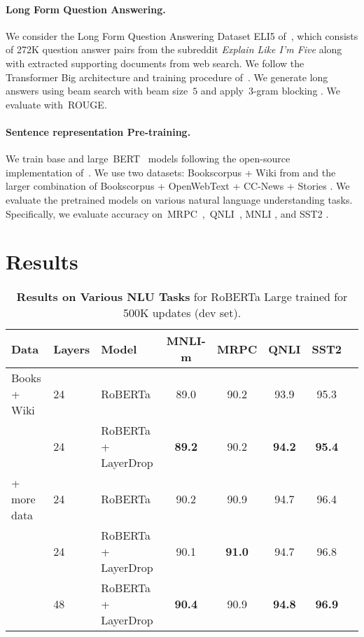 \paragraph{Long Form Question Answering.}

We consider the Long Form Question Answering Dataset ELI5 of~\citet{fan2019eli5}, which consists of 272K question answer pairs from the subreddit \textit{Explain Like I'm Five} along with extracted supporting documents from web search.
We follow the Transformer Big architecture and training procedure of~\citet{fan2019eli5}. We generate long answers using beam search with beam size~$5$ and apply~$3$-gram blocking \citep{fan17controllable}.
We evaluate with~ROUGE.

\paragraph{Sentence representation Pre-training.}

We train base and large~BERT~\citep{devlin2018bert} models following the open-source implementation of~\citet{liu2019roberta}. We use two datasets: Bookscorpus + Wiki from \cite{liu2019roberta} and the larger combination of Bookscorpus + OpenWebText + CC-News + Stories \citep{liu2019roberta}. We evaluate the pretrained models on various natural language understanding tasks.
Specifically, we evaluate accuracy on~MRPC~\citep{dolan2005automatically},~QNLI~\citep{rajpurkar2016squad}, MNLI \citep{williams2018broad}, and SST2 \citep{socher2013recursive}.

\section{Results}


\begin{table}
\centering
\begin{tabular}{lllccccc}
\toprule
Data & Layers & Model  &  MNLI-m & MRPC & QNLI & SST2 \\
\midrule
Books + Wiki & 24 & RoBERTa             &  89.0    & 90.2 & 93.9     & 95.3 \\
 & 24 & RoBERTa + LayerDrop & \bf 89.2 & 90.2 & \bf 94.2 & \bf 95.4 \\
\midrule
+ more data & 24 & RoBERTa             & 90.2 & 90.9 & 94.7 & 96.4 \\
 & 24 & RoBERTa + LayerDrop &  90.1 & \bf 91.0 & 94.7 &  96.8 \\
 & 48\footnotemark & RoBERTa + LayerDrop & \bf 90.4 & 90.9 &  \bf 94.8 &  \bf 96.9\\
\bottomrule
\end{tabular}
\caption{
\textbf{Results on Various NLU Tasks} for RoBERTa Large trained for 500K updates (dev set).}
\label{tab:bert_regularization}
\end{table}


